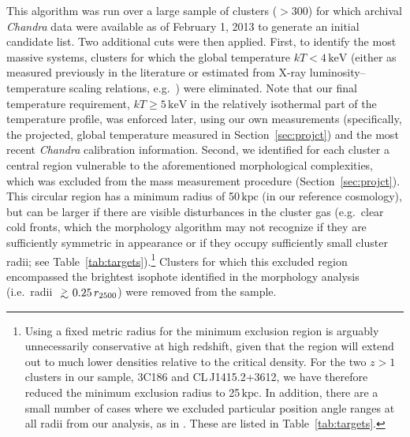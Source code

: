 \documentclass[useAMS,usenatbib,usegraphicx]{mn2e}
\newcommand*{\unit}[1]{\ensuremath{\mathrm{\, #1}}}
\newcommand*{\kpc}{\unit{kpc}}
\newcommand*{\keV}{\unit{keV}}
\newcommand*{\gtsim}{\ {\raise-.75ex\hbox{$\buildrel>\over\sim$}}\ }
\newcommand*{\secref}{Section}
\newcommand*{\tabref}{Table}
\newcommand*{\Chandra}{{\it Chandra}}
\newcommand*{\arsemf}{\citetalias{Allen0706.0033}}
\begin{document}
This algorithm was run over a large sample of clusters ($>300$) for which archival \Chandra{} data were available as of February 1, 2013 to generate an initial candidate list. Two additional cuts were then applied. First, to identify the most massive systems, clusters for which the global temperature $kT<4\keV$ (either as measured previously in the literature or estimated from X-ray luminosity--temperature scaling relations, e.g.\ \citealt{Mantz0909.3099}) were eliminated. Note that our final temperature requirement, $kT \geq 5\keV$ in the relatively isothermal part of the temperature profile, was enforced later, using our own measurements (specifically, the projected, global temperature measured in \secref~\ref{sec:projct}) and the most recent \Chandra{} calibration information. Second, we identified for each cluster a central region vulnerable to the aforementioned morphological complexities, which was excluded from the mass measurement procedure (\secref~\ref{sec:projct}). This circular region has a minimum radius of 50\kpc{} (in our reference cosmology), but can be larger if there are visible disturbances in the cluster gas (e.g.\ clear cold fronts, which the morphology algorithm may not recognize if they are sufficiently symmetric in appearance or if they occupy sufficiently small cluster radii; see \tabref~\ref{tab:targets}).\footnote{Using a fixed metric radius for the minimum exclusion region is arguably unnecessarily conservative at high redshift, given that the region will extend out to much lower densities relative to the critical density. For the two $z>1$ clusters in our sample, 3C186 and CL\,J1415.2+3612, we have therefore reduced the minimum exclusion radius to 25\kpc. In addition, there are a small number of cases where we excluded particular position angle ranges at all radii from our analysis, as in \arsemf{}. These are listed in \tabref~\ref{tab:targets}.} Clusters for which this excluded region encompassed the brightest isophote identified in the morphology analysis (i.e.\ radii $\gtsim 0.25\, r_{2500}$) were removed from the sample.
\end{document}
